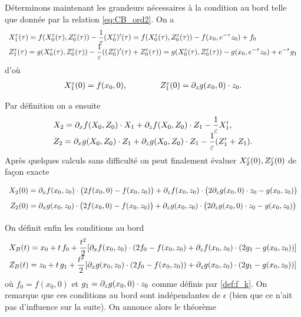 \vspace*{12pt}
Déterminons maintenant les grandeurs nécessaires à la condition au bord telle que donnée par la relation \eqref{eq:CB_ord2}. 
On a 
$$ \begin{array}{l}
\displaystyle
X_1^{\varepsilon}(\tau) = f(X_0^{\varepsilon}(\tau),Z_0^{\varepsilon}(\tau)) - \frac{1}{\varepsilon} (X_0^{\varepsilon})'(\tau) = f(X_0^{\varepsilon}(\tau),Z_0^{\varepsilon}(\tau)) - f(x_0,e^{-\tau}z_0) + f_0 \\
\displaystyle
Z_1^{\varepsilon}(\tau) = g(X_0^{\varepsilon}(\tau),Z_0^{\varepsilon}(\tau)) - \frac{1}{\varepsilon} ((Z_0^{\varepsilon})'(\tau) + Z_0^{\varepsilon}(\tau)) = g(X_0^{\varepsilon}(\tau), Z_0^{\varepsilon}(\tau)) - g(x_0,e^{-\tau}z_0) + e^{-\tau}g_1 \\
\end{array} $$
d'où \begin{equation*} %
\begin{array}{l}
X_1\eeps(0) = f(x_0,0), \qquad\qquad Z_1\eeps(0) = \dpz g(x_0,0)\cdot z_0 .
\end{array}
\end{equation*}

Par définition on a ensuite 
\begin{equation*}
\begin{array}{l}
X_2 = \partial_{x} f(X_0,Z_0)\cdot X_1 + \partial_{z} f(X_0,Z_0)\cdot Z_1 - \dfrac{1}{\varepsilon}X_1' , \\
Z_2 = \partial_{x} g(X_0,Z_0)\cdot Z_1 + \partial_{z} g(X_0,Z_0)\cdot Z_1 - \dfrac{1}{\varepsilon}(Z_1' + Z_1).  
\end{array}
\end{equation*}
Après quelques calculs sans difficulté on peut finalement évaluer $X_2^{\varepsilon}(0),Z_2^{\varepsilon}(0)$ de façon exacte 
\begin{equation*} %
\begin{array}{c}
X_2(0) = \dpx f(x_0,z_0)\cdot \big( 2f(x_0,0) - f(x_0,z_0) \big) + \dpz f(x_0,z_0)\cdot \big( 2\dpz g(x_0,0)\cdot z_0 - g(x_0,z_0) \big) \vphantom{\dfrac 1 1} \\ \vphantom{\dfrac 1 1}
Z_2(0) = \dpx g(x_0,z_0)\cdot \big( 2f(x_0,0) - f(x_0,z_0) \big) + \dpz g(x_0,z_0)\cdot \big( 2\dpz g(x_0,0)\cdot z_0 - g(x_0,z_0) \big)
\end{array} 
\end{equation*}

On définit enfin les conditions au bord 
\begin{equation} 
\label{eq:CB_XZ}
\begin{array}{l} \displaystyle
X_B(t) = x_0 + t\, f_0 + \frac{t^2}{2} [\partial_{x} f(x_0,z_0)\cdot (2f_0 - f(x_0,z_0) + \partial_{z} f(x_0,z_0)\cdot (2g_1 - g(x_0,z_0)) ] 
\\ \displaystyle
Z_B(t) = z_0 + t\, g_1 + \frac{t^2}{2} [\partial_{x} g(x_0,z_0)\cdot (2f_0 - f(x_0,z_0)) + \partial_{z} g(x_0,z_0)\cdot (2g_1 - g(x_0,z_0))] 
\end{array}
\end{equation} 
où $f_0 = f(x_0,0)$ et $g_1 = \partial_{z} g(x_0,0)\cdot z_0$ comme définis par \eqref{def:f_k}. 
On remarque que ces conditions au bord sont indépendantes de $\epsilon$ (bien que ce n'ait pas d'influence sur la suite). 
On annonce alors le théorème 

